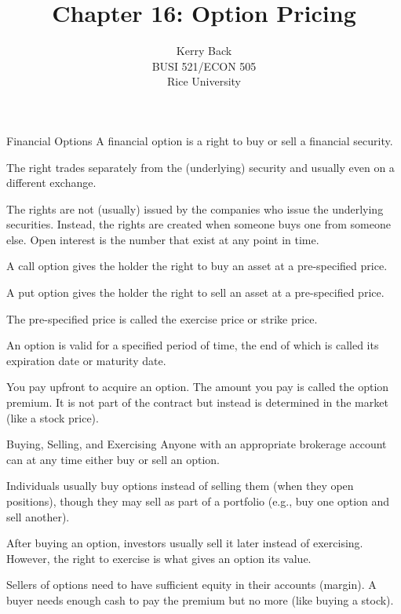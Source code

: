 \documentclass[10pt]{beamer}
\title{Chapter 16: Option Pricing}
\date{}
\author{Kerry Back\\ 
BUSI 521/ECON 505\\
Rice University}
\begin{document}
\maketitle



\begin{frame}{Financial Options}
    A financial option is a right to buy or sell  a financial security.
    
    The right trades separately from the (underlying) security and usually even on a different exchange.
    
    The rights are not (usually) issued by the companies who issue the underlying securities.  Instead, the rights are created when someone buys one from someone else.  Open interest is the number that exist at any point in time.
    
\end{frame}
\begin{frame}
A \alert{call} option gives the holder the right to \alert{buy} an asset at a pre-specified price.

A \alert{put} option gives the holder the right to \alert{sell} an asset at a pre-specified price.

The pre-specified price is called the exercise price or strike price.  

An option is valid for a specified period of time, the end of which is called its expiration date or maturity date.

You pay upfront to acquire an option.  The amount you pay is called the option premium.  It is not part of the contract but instead is determined in the market (like a stock price).
\end{frame}

\begin{frame}{Buying, Selling, and Exercising}
    Anyone with an appropriate brokerage account can at any time either buy or sell an option.
    
    Individuals usually buy options instead of selling them (when they open positions), though they may sell as part of a portfolio (e.g., buy one option and sell another).
    
    After buying an option, investors usually sell it later instead of exercising.  However, the right to exercise is what gives an option its value.
    
    Sellers of options need to have sufficient equity in their accounts (margin).  A buyer needs enough cash to pay the premium but no more (like buying a stock).
\end{frame}
\end{document}
